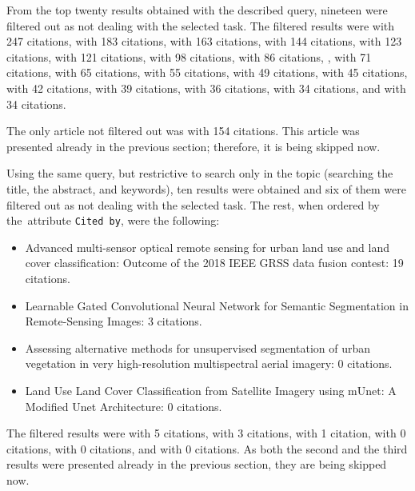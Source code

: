 \noindent From the top twenty results obtained with the described query, nineteen were filtered out as not dealing with the selected task. The filtered results were \cite{object-based-lc} with 247 citations, \cite{review-ml-in-rs} with 183 citations, \cite{rf-knn-svm-for-lc} with 163 citations, \cite{survey-dl-remote-sensing} with 144 citations, \cite{review-dl-rs-2017} with 123 citations, \cite{review-uav-applications} with 121 citations, \cite{car-detection-uav} with 98 citations, \cite{review-water-dl} with 86 citations, \cite{landslide-evaluation}, \cite{rainfall-runoff-lstm} with 71 citations, \cite{3d-cnn-crop} with 65 citations, \cite{dl-street-view-green-blue} with 55 citations, \cite{review-st-fusion-multisource} with 49 citations, \cite{dl-vs-obia-ziziphus-lotus} with 45 citations, \cite{cnn-3d-als-clouds} with 42 citations, \cite{review-uav-rs} with 39 citations, \cite{hess-opinions} with 36 citations, \cite{landsat-l-band-sar} with 34 citations, and \cite{cnn-fusion-clouds} with 34 citations.

The only article not filtered out was \cite{cnn-satellite-orthoimagery} with 154 citations. This article was presented already in the previous section; therefore, it is being skipped now.

Using the same query, but restrictive to search only in the topic (searching the title, the abstract, and keywords), ten results were obtained and six of them were filtered out as not dealing with the selected task. The rest, when ordered by the~attribute \verb|Cited by|, were the following:

\begin{itemize}
	\item Advanced multi-sensor optical remote sensing for urban land use and land cover classification: Outcome of the 2018 IEEE GRSS data fusion contest: 19 citations. \cite{ieee-grss-2018}
	\item Learnable Gated Convolutional Neural Network for Semantic Segmentation in Remote-Sensing Images: 3 citations. \cite{gated-cnn-rs}
	\item Assessing alternative methods for unsupervised segmentation of urban vegetation in very high-resolution multispectral aerial imagery: 0 citations. \cite{urban-green-unsupervised-aerial}
	\item Land Use Land Cover Classification from Satellite Imagery using mUnet: A Modified Unet Architecture: 0 citations. \cite{munet}
\end{itemize}

\noindent The filtered results were \cite{cnn-urban-aerial} with 5 citations, \cite{svm-ann-cnn-vegetation-species} with 3 citations, \cite{urban-green-quantification} with 1 citation, \cite{dl-water-leak} with 0 citations, \cite{dl-vegetation} with 0 citations, and \cite{ground-based-hs-cnn} with 0 citations. As both the second and the third results were presented already in the previous section, they are being skipped now.

